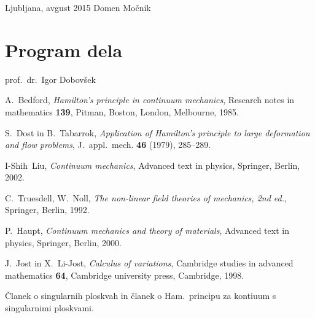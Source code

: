 \documentclass[12pt,a4paper]{report}
\begin{document}
\null

\noindent Ljubljana, avgust 2015 \hfill Domen Močnik
\pagebreak



\tableofcontents
\pagebreak



\chapter*{Program dela}


\null

\noindent prof.~dr.~Igor Dobovšek
\pagebreak




\pagebreak












\begin{thebibliography}{99}

A.~Bedford, \emph{Hamilton's principle in continuum mechanics}, Research notes in mathematics {\bf 139},
Pitman, Boston, London, Melbourne, 1985.

S.~Dost in B.~Tabarrok, \emph{Application of Hamilton's principle to large deformation and flow problems},
J.~appl.~mech. {\bf 46} (1979), 285--289.

I-Shih~Liu, \emph{Continuum mechanics}, Advanced text in physics,
Springer, Berlin, 2002.

C.~Truesdell, W.~Noll, \emph{The non-linear field theories of mechanics, 2nd ed.},
Springer, Berlin, 1992.

P.~Haupt, \emph{Continuum mechanics and theory of materials}, Advanced text in physics,
Springer, Berlin, 2000.

J.~Jost in X.~Li-Jost, \emph{Calculus of variations}, Cambridge studies in advanced mathematics {\bf 64},
Cambridge university press, Cambridge, 1998.

\textcolor[rgb]{1,0,0}{Članek o singularnih ploskvah in članek o Ham.~principu za kontiuum s singularnimi ploskvami.}

\end{thebibliography}
\end{document}
